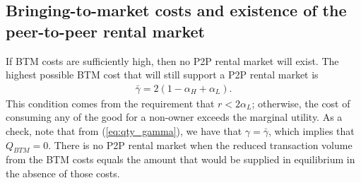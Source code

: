 \documentclass[11pt]{article}
\begin{document}
\subsection{Bringing-to-market costs and existence of the peer-to-peer rental market}
If BTM costs are sufficiently high, then no P2P rental market will exist. 
The highest possible BTM cost that will still support a P2P rental market is 
\begin{align} 
  \bar{\gamma} = 2(1-\alpha_H + \alpha_L). 
\end{align}
This condition comes from the requirement that  $r < 2 \alpha_L$; otherwise, the cost of consuming any of the good for a non-owner exceeds the marginal utility. 
As a check, note that from (\ref{eq:qty_gamma}), we have that $\gamma = \bar{\gamma}$, which implies that $Q_{BTM} = 0$.
There is no P2P rental market when the reduced transaction volume from the BTM costs equals the amount that would be supplied in equilibrium in the absence of those costs. 

\end{document}
